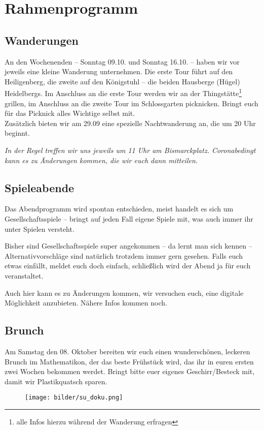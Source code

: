 \section{Rahmenprogramm}
\label{vorkurs-rahmenprogramm}

\subsection{Wanderungen}
An den Wochenenden -- Sonntag 09.10. und Sonntag 16.10. -- haben wir vor jeweils eine kleine Wanderung unternehmen. Die erste Tour führt auf den Heiligenberg, die zweite auf den Königstuhl -- die beiden Hausberge (Hügel) Heidelbergs. Im Anschluss an die erste Tour werden wir an der Thingstätte\footnote{alle Infos hierzu während der Wanderung erfragen} grillen, im Anschluss an die zweite Tour im Schlossgarten picknicken. Bringt euch für das Picknick alles Wichtige selbst mit.\\

Zusätzlich bieten wir am 29.09 eine spezielle Nachtwanderung an, die um 20 Uhr beginnt.

\noindent\emph{In der Regel treffen wir uns jeweils um 11 Uhr am Bismarckplatz. Coronabedingt kann es zu Änderungen kommen, die wir euch dann mitteilen.}

\vfill


\eject

\subsection{Spieleabende}
Das Abendprogramm wird spontan entschieden, meist handelt es sich um Gesellschaftsspiele -- bringt auf jeden Fall eigene Spiele mit, was auch immer ihr unter Spielen versteht.

Bisher sind Gesellschaftsspiele super angekommen -- da lernt man sich kennen -- Alternativvorschläge sind natürlich trotzdem immer gern gesehen. Falls euch etwas einfällt, meldet euch doch einfach, schließlich wird der Abend ja für euch veranstaltet.

Auch hier kann es zu Änderungen kommen, wir versuchen euch, eine digitale Möglichkeit anzubieten. Nähere Infos kommen noch.

\subsection{Brunch}
Am Samstag den 08. Oktober bereiten wir euch einen wunderschönen, leckeren Brunch im \gls{Mathematikon}, der das beste Frühstück wird, das ihr in euren ersten zwei Wochen bekommen werdet. Bringt bitte euer eigenes Geschirr/Besteck mit, damit wir Plastikquatsch sparen.


\vspace{4cm}

\begin{figure}[h]
\centering
\texttt{[image: bilder/su\_doku.png]}
\end{figure}

